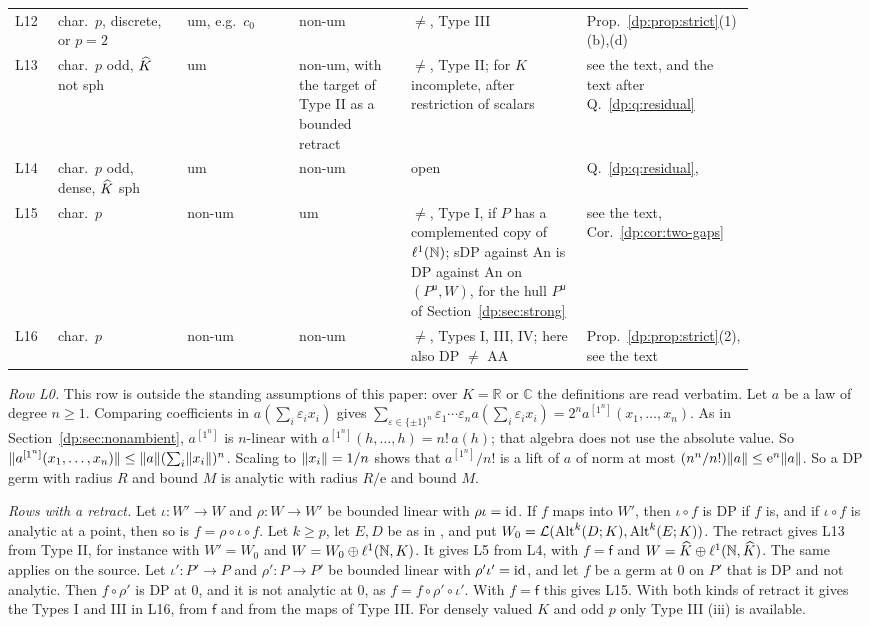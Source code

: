 \begin{table}[htbp]
\begin{tabular}{@{}p{0.05\linewidth}p{0.155\linewidth}p{0.135\linewidth}p{0.135\linewidth}p{0.195\linewidth}p{0.185\linewidth}@{}}
L12 & char.\ $p$, discrete, or $p=2$ & um, e.g.\ $c_0$ & non-um & $\ne$, Type III & Prop.~\ref{dp:prop:strict}(1)(b),(d)\\
L13 & char.\ $p$ odd, $\widehat K$ not sph & um & non-um, with the target of Type II as a bounded retract & $\ne$, Type II; for $K$ incomplete, after restriction of scalars & see the text, and the text after Q.~\ref{dp:q:residual}\\
L14 & char.\ $p$ odd, dense, $\widehat K$ sph & um & non-um & open & Q.~\ref{dp:q:residual}, \cite[Remark~E.2]{I}\\
L15 & char.\ $p$ & non-um & um & $\ne$, Type I, if $P$ has a complemented copy of $\ell^1(\mathbb N)$; sDP against An is DP against An on $(P^{\mathsf u},W)$, for the hull $P^{\mathsf u}$ of Section~\ref{dp:sec:strong} & see the text, Cor.~\ref{dp:cor:two-gaps}\\
L16 & char.\ $p$ & non-um & non-um & $\ne$, Types I, III, IV; here also DP $\ne$ AA & Prop.~\ref{dp:prop:strict}(2), see the text\\
\end{tabular}
\end{table}

\emph{Row L0.} This row is outside the standing assumptions of this paper: over $K=\mathbb R$ or $\mathbb C$ the definitions are read verbatim. Let $a$ be a law of degree $n\ge1$. Comparing coefficients in $a(\sum_i\varepsilon_ix_i)$ gives $\sum_{\varepsilon\in\{\pm1\}^n}\varepsilon_1\cdots\varepsilon_na(\sum_i\varepsilon_ix_i)=2^na^{[1^n]}(x_1,\dots,x_n)$. As in Section~\ref{dp:sec:nonambient}, $a^{[1^n]}$ is $n$\nobreakdash-linear with $a^{[1^n]}(h,\dots,h)=n!\,a(h)$; that algebra does not use the absolute value. So $\lVert a^{[1^n]}(x_1,\dots,x_n)\rVert\le\lVert a\rVert(\sum_i\lVert x_i\rVert)^n$. Scaling to $\lVert x_i\rVert=1/n$ shows that $a^{[1^n]}/n!$ is a lift of $a$ of norm at most $(n^n/n!)\lVert a\rVert\le\mathrm e^n\lVert a\rVert$. So a DP germ with radius $R$ and bound $M$ is analytic with radius $R/\mathrm e$ and bound $M$.

\emph{Rows with a retract.} Let $\iota\colon W'\to W$ and $\rho\colon W\to W'$ be bounded linear with $\rho\iota=\mathrm{id}$. If $f$ maps into $W'$, then $\iota\circ f$ is DP if $f$ is, and if $\iota\circ f$ is analytic at a point, then so is $f=\rho\circ\iota\circ f$. Let $k\ge p$, let $E,D$ be as in \cite[Theorem~7.2(2)]{I}, and put $W_0=\mathcal L(\operatorname{Alt}^k(D;K),\operatorname{Alt}^k(E;K))$. The retract gives L13 from Type II, for instance with $W'=W_0$ and $W=W_0\oplus\ell^1(\mathbb N,K)$. It gives L5 from L4, with $f=\mathsf f$ and $W=\widehat K\oplus\ell^1(\mathbb N,\widehat K)$. The same applies on the source. Let $\iota'\colon P'\to P$ and $\rho'\colon P\to P'$ be bounded linear with $\rho'\iota'=\mathrm{id}$, and let $f$ be a germ at $0$ on $P'$ that is DP and not analytic. Then $f\circ\rho'$ is DP at $0$, and it is not analytic at $0$, as $f=f\circ\rho'\circ\iota'$. With $f=\mathsf f$ this gives L15. With both kinds of retract it gives the Types I and III in L16, from $\mathsf f$ and from the maps of Type III. For densely valued $K$ and odd $p$ only Type III (iii) is available.

